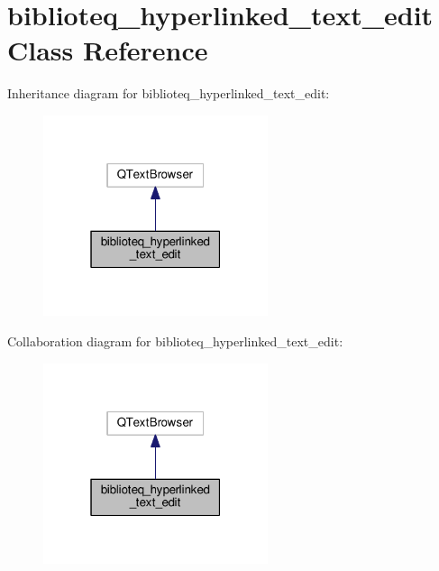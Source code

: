 \hypertarget{classbiblioteq__hyperlinked__text__edit}{}\section{biblioteq\+\_\+hyperlinked\+\_\+text\+\_\+edit Class Reference}
\label{classbiblioteq__hyperlinked__text__edit}


Inheritance diagram for biblioteq\+\_\+hyperlinked\+\_\+text\+\_\+edit\+:
\nopagebreak
\begin{figure}[H]
\begin{center}
\leavevmode
\includegraphics[width=187pt]{classbiblioteq__hyperlinked__text__edit__inherit__graph}
\end{center}
\end{figure}


Collaboration diagram for biblioteq\+\_\+hyperlinked\+\_\+text\+\_\+edit\+:
\nopagebreak
\begin{figure}[H]
\begin{center}
\leavevmode
\includegraphics[width=187pt]{classbiblioteq__hyperlinked__text__edit__coll__graph}
\end{center}
\end{figure}

